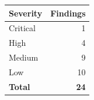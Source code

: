 \begin{tabular}{@{}lr@{}}
\toprule
\textbf{Severity} & \textbf{Findings}\\
\midrule
Critical & 1 \\
High & 4 \\
Medium & 9 \\
Low & 10 \\
\midrule
\textbf{Total} & \textbf{24}\\
\bottomrule
\end{tabular}
